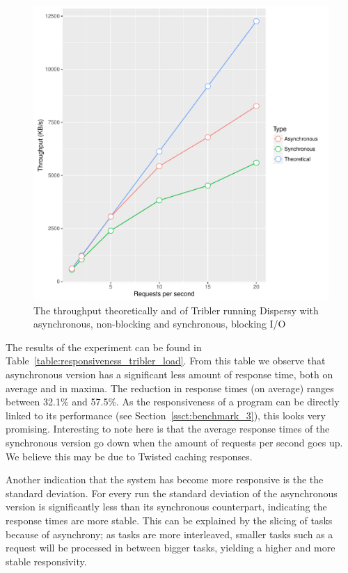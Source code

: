 \begin{figure}[!h]
	\centering
	\includegraphics[width=\linewidth]{experimentation/images/throughput_requests.pdf}
	\caption{The throughput theoretically and of Tribler running Dispersy with asynchronous, non-blocking and synchronous, blocking I/O }
	\label{fig:throughput_requests}
\end{figure} 

The results of the experiment can be found in Table~\ref{table:responsiveness_tribler_load}.
From this table we observe that asynchronous version has a significant less amount of response time, both on average and in maxima.
The reduction in response times (on average) ranges between 32.1\% and 57.5\%.
As the responsiveness of a program can be directly linked to its performance (see Section~\ref{ssct:benchmark_3}), this looks very promising.
Interesting to note here is that the average response times of the synchronous version go down when the amount of requests per second goes up.
We believe this may be due to Twisted caching responses.

Another indication that the system has become more responsive is the the standard deviation.
For every run the standard deviation of the asynchronous version is significantly less than its synchronous counterpart, indicating the response times are more stable. 
This can be explained by the slicing of tasks because of asynchrony; as tasks are more interleaved, smaller tasks such as a request will be processed in between bigger tasks, yielding a higher and more stable responsivity.


